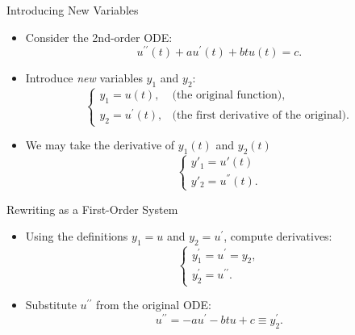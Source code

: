 \documentclass[10pt]{beamer}
\begin{document}

\begin{frame}{Introducing New Variables}
\begin{itemize}
    \item Consider the 2nd-order ODE:
    \[
    u^{\prime\prime}(t) + a u^\prime(t) + b t u(t) = c.
    \]

    \item Introduce \textit{new} variables $y_1$ and $y_2$:
    \[
    \begin{cases}
    y_1 = u(t), & \text{(the original function)}, \\
    y_2 = u^\prime(t), & \text{(the first derivative of the original)}.
    \end{cases}
    \]

    \item We may take the derivative of $y_1(t)$ and $y_2(t)$
    \[
    \begin{cases}
    y'_1 = u'(t) \\
    y'_2 = u^{''}(t) .
    \end{cases}
    \]
\end{itemize}
\end{frame}


\begin{frame}{Rewriting as a First-Order System}
\begin{itemize}
    \item Using the definitions \(y_1 = u\) and \(y_2 = u^\prime\), compute derivatives:
    \[
    \begin{cases}
    y_1^\prime = u^\prime = y_2, \\
    y_2^\prime = u^{\prime\prime}.
    \end{cases}
    \]

    \item Substitute \(u^{\prime\prime}\) from the original ODE:
    \[
    u^{\prime\prime} = -a u^\prime - b t u + c \equiv y_2^{\prime}.
    \]




\end{itemize}
\end{frame}
\end{document}
